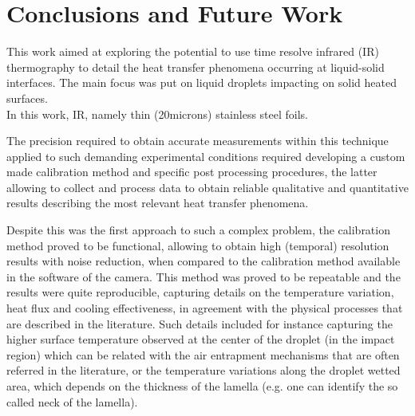 \chapter{Conclusions and Future Work}
\label{cap:conclusions}

\par This work aimed at exploring the potential to use time resolve infrared (IR) thermography to detail the heat transfer phenomena occurring at liquid-solid interfaces. The main focus was put on liquid droplets impacting on solid heated surfaces.\\ In this work, IR, namely thin (20microns) stainless steel foils. \par The precision required to obtain accurate measurements within this technique applied to such demanding experimental conditions required developing a custom made calibration method and specific post processing procedures, the latter allowing to collect and process data to obtain reliable qualitative and quantitative results describing the most relevant heat transfer phenomena.\\
\par Despite this was the first approach to such a complex problem, the calibration method proved to be functional, allowing to obtain high (temporal) resolution results with noise reduction, when compared to the calibration method available in the software of the camera. This method was proved to be repeatable and the results were quite reproducible, capturing details on the temperature variation, heat flux and cooling effectiveness, in agreement with the physical processes that are described in the literature. Such details included for instance capturing the higher surface temperature observed at the center of the droplet (in the impact region) which can be related with the air entrapment mechanisms that are often referred in the literature, or the temperature variations along the droplet wetted area, which depends on the thickness of the lamella (e.g. one can identify the so called neck of the lamella). \\
